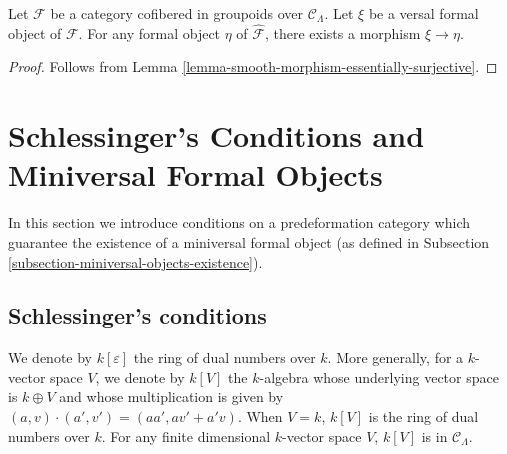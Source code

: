 \begin{lemma}
\label{lemma-versal-object-quasi-initial}
Let $\mathcal F$ be a category cofibered in groupoids over $\mathcal 
C_{\Lambda}$.  Let $\xi$ be a versal formal object of $\mathcal F$.  For any 
formal object $\eta$ of $\widehat{\mathcal F}$, there exists a morphism $\xi 
\rightarrow \eta$.
\end{lemma}

\begin{proof}
Follows from Lemma \ref{lemma-smooth-morphism-essentially-surjective}.
\end{proof}




\section{Schlessinger's Conditions and Miniversal Formal Objects}
\label{section-miniversal-objects}

\noindent
In this section we introduce conditions on a predeformation category which 
guarantee the existence of a miniversal formal object (as defined in
Subsection \ref{subsection-miniversal-objects-existence}).




\subsection{Schlessinger's conditions}
\label{section-schlessinger-conditions}

\noindent
We denote by $k[\varepsilon]$ the ring of dual numbers over $k$.  More 
generally, for a $k$-vector space $V$, we denote by $k[V]$ the $k$-algebra 
whose underlying vector space is $k \oplus V$ and whose multiplication is given 
by $(a,v) \cdot (a',v') = (aa', av' + a'v)$.  When $V = k$, $k[V]$ is the ring 
of dual numbers over $k$.  For any finite dimensional $k$-vector space $V$, 
$k[V]$ is in $\mathcal C_{\Lambda}$.

